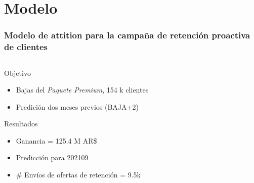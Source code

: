 \documentclass[aspectratio=169]{beamer} %
\begin{document}
\section{Modelo}

\begin{frame}
  \frametitle{Modelo de attition para la campaña de retención proactiva de clientes}
  \begin{columns}[onlytextwidth]
    \begin{column}{.6\textwidth}
      \begin{block}{Objetivo}
        \begin{itemize}
          \item Bajas del \emph{Paquete Premium}, 154 k clientes
          \item Predición dos meses previos (BAJA+2)
		    \end{itemize}
      \end{block}
 
      \begin{block}{Resultados}
        \begin{itemize}
			    \item Ganancia = 125.4 M AR\$
			    \item Predicción para 202109
          \item \# Envíos de ofertas de retención = 9.5k 
	    \end{itemize}
      \end{block}
    \end{column}
  \end{columns}
\end{frame}
\end{document}
